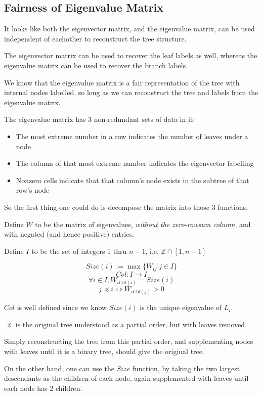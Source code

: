 \documentclass{report}
\begin{document}
\subsection{Fairness of Eigenvalue Matrix}

It looks like both the eigenvector matrix, and the eigenvalue matrix, can be
used independent of eachother to reconstruct the tree structure.

The eigenvector matrix can be used to recover the leaf labels as well, whereas
the eigenvalue matrix can be used to recover the branch labels.

We know that the eigenvalue matrix is a fair representation of the tree with
internal nodes labelled, so long as we can reconstruct the tree and labels from
the eigenvalue matrix.

The eigenvalue matrix has 3 non-redundant sets of data in it:
\begin{itemize}
	\item The most extreme number in a row indicates the number of leaves under
		a node
	\item The column of that most extreme number indicates the eigenvector
		labelling
	\item Nonzero cells indicate that that column's node exists in the subtree
		of that row's node
\end{itemize}

So the first thing one could do is decompose the matrix into those 3 functions.

Define $W$ to be the matrix of eigenvalues, \emph{without the zero-rowsum
column}, and with negated (and hence positive) entries.

Define $I$ to be the set of integers $1$ thru $n-1$, i.e. $\mathds{Z} \cap [1,
n-1]$

\[\mathit{Size}(i) := \max\{W_{ij} | j \in I\}\]
\[\mathit{Col}: I \rightarrow I\]
\[\forall i \in I, W_{i \mathit{Col}(i)} = \mathit{Size}(i)\]
\[j \preccurlyeq i \Leftrightarrow W_{i \mathit{Col}(j)} > 0\]

$\mathit{Col}$ is well defined since we know $\mathit{Size}(i)$ is the unique
eigenvalue of $L_i$.

$\preccurlyeq$ is the original tree understood as a partial order, but with
leaves removed.

Simply reconstructing the tree from this partial order, and supplementing nodes
with leaves until it is a binary tree, should give the original tree.

On the other hand, one can use the $\mathit{Size}$ function, by taking the two
largest descendants as the children of each node, again supplemented with
leaves until each node has 2 children.
\end{document}
